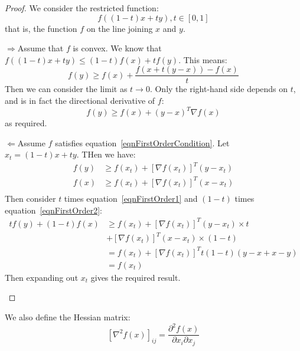 \documentclass[../Main.tex]{subfiles}
\begin{document}
\begin{proof}
    We consider the restricted function:
    \begin{equation*}
        f((1-t)x + ty), t \in [0, 1]
    \end{equation*}
    that is, the function $f$ on the line joining $x$ and $y$.
    \begin{proofdirection}{$\Rightarrow$}{Assume that $f$ is convex.}
        We know that $f((1-t)x + ty) \leq (1-t)f(x) + tf(y)$. This means:
        \begin{equation*}
            f(y) \geq f(x) + \frac{f(x + t(y-x)) - f(x)}{t}
        \end{equation*}
        Then we can consider the limit as $t \to 0$. Only the right-hand side depends on $t$, and is in fact the directional derivative of $f$:
        \begin{equation*}
            f(y) \geq f(x) + (y - x)^T \nabla f(x)
        \end{equation*}
        as required.
    \end{proofdirection}
    \begin{proofdirection}{$\Leftarrow$}{Assume $f$ satisfies equation~\ref{eqnFirstOrderCondition}.}
        Let $x_t = (1 - t)x + ty$. THen we have:
        \begin{align}
            f(y) &\geq f(x_t) + \left[\nabla f(x_t)\right]^T (y - x_t) \label{eqnFirstOrder1} \\
            f(x) &\geq f(x_t) + \left[\nabla f(x_t)\right]^T (x - x_t) \label{eqnFirstOrder2} \\
        \end{align}
        Then consider $t$ times equation~\ref{eqnFirstOrder1} and $(1-t)$ times equation~\ref{eqnFirstOrder2}:
        \begin{align*}
            tf(y) + (1-t)f(x) &\geq f(x_t) + \left[\nabla f(x_t)\right]^T (y - x_t) \times t \\
            &+ \left[\nabla f(x_t)\right]^T (x - x_t) \times (1-t) \\
            &= f(x_t) + \left[\nabla f(x_t)\right]^T t(1-t)(y - x + x - y) \\
            &= f(x_t)
        \end{align*}
        Then expanding out $x_t$ gives the required result.
    \end{proofdirection}
\end{proof}
We also define the Hessian matrix:
\begin{equation}
    \left[\nabla^2 f(x)\right]_{ij} = \frac{\partial^2 f(x)}{\partial x_i \partial x_j}
    \label{eqnHessian}
\end{equation}
\end{document}
